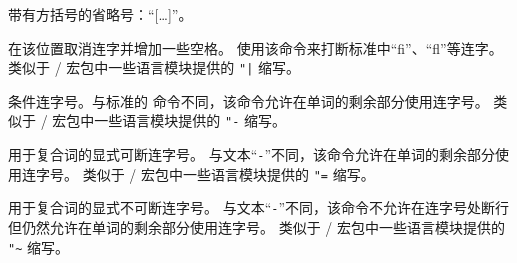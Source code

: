 \begin{ltxsyntax}


带有方括号的省略号：“[\dots\unkern]”。



在该位置取消连字并增加一些空格。
使用该命令来打断标准中“fi”、“fl”等连字。
类似于 / 宏包中一些语言模块提供的 \verb+"|+ 缩写。



条件连字号。与标准的 \cmd{-} 命令不同，该命令允许在单词的剩余部分使用连字号。
类似于 / 宏包中一些语言模块提供的 \verb+"-+ 缩写。



用于复合词的显式可断连字号。
与文本“\texttt{-}”不同，该命令允许在单词的剩余部分使用连字号。
类似于 / 宏包中一些语言模块提供的 \verb+"=+ 缩写。



用于复合词的显式不可断连字号。
与文本“\texttt{-}”不同，该命令不允许在连字号处断行但仍然允许在单词的剩余部分使用连字号。
类似于 / 宏包中一些语言模块提供的 \verb+"~+ 缩写。


\end{ltxsyntax}

